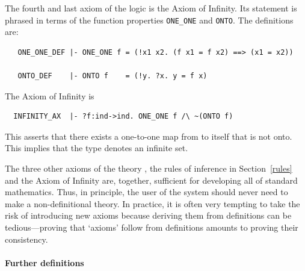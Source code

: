 \noindent
The fourth and last axiom of the \HOL{} logic is the Axiom of
Infinity. Its statement is phrased in terms of
the function properties {\small\verb+ONE_ONE+} and {\small\verb+ONTO+}. The
definitions are:

\begin{hol}
\begin{verbatim}
   ONE_ONE_DEF |- ONE_ONE f = (!x1 x2. (f x1 = f x2) ==> (x1 = x2))

   ONTO_DEF    |- ONTO f    = (!y. ?x. y = f x)
\end{verbatim}
\end{hol}

\noindent The Axiom of Infinity is
%
\begin{hol}
\begin{verbatim}
  INFINITY_AX  |- ?f:ind->ind. ONE_ONE f /\ ~(ONTO f)
\end{verbatim}
\end{hol}
%
\noindent
This asserts that there exists a one-to-one map from  to
itself that is not onto. This implies that the type 
denotes an infinite set.
%

The three other axioms of the theory , the rules of
inference in Section~\ref{rules} and the Axiom of Infinity are,
together, sufficient for developing all of standard mathematics. Thus,
in principle, the user of the \HOL{} system should never need to make a
non-definitional
%
%
%
%
theory. In practice, it is often very tempting to take the risk of
introducing new axioms because deriving them from definitions can be
tedious---proving that `axioms' follow from definitions amounts to
proving their consistency.

\paragraph {Further definitions}

